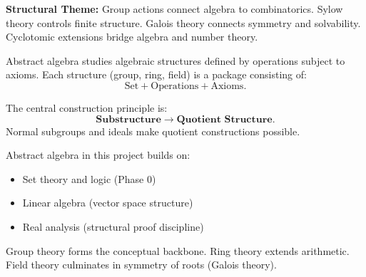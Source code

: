 \begin{enumerate}
\vspace{0.5em}
\textbf{Structural Theme:}
Group actions connect algebra to combinatorics.
Sylow theory controls finite structure.
Galois theory connects symmetry and solvability.
Cyclotomic extensions bridge algebra and number theory.

\end{enumerate}


\vspace{1em}

\begin{remark}
Abstract algebra studies algebraic structures defined by operations
subject to axioms. Each structure (group, ring, field) is a
package consisting of:
\[
\text{Set} + \text{Operations} + \text{Axioms}.
\]
\end{remark}

\begin{remark}
The central construction principle is:
\[
\textbf{Substructure} \longrightarrow \textbf{Quotient Structure}.
\]
Normal subgroups and ideals make quotient constructions possible.
\end{remark}

\begin{remark}
Abstract algebra in this project builds on:

\begin{itemize}
    \item Set theory and logic (Phase 0)
    \item Linear algebra (vector space structure)
    \item Real analysis (structural proof discipline)
\end{itemize}

Group theory forms the conceptual backbone.
Ring theory extends arithmetic.
Field theory culminates in symmetry of roots (Galois theory).
\end{remark}






